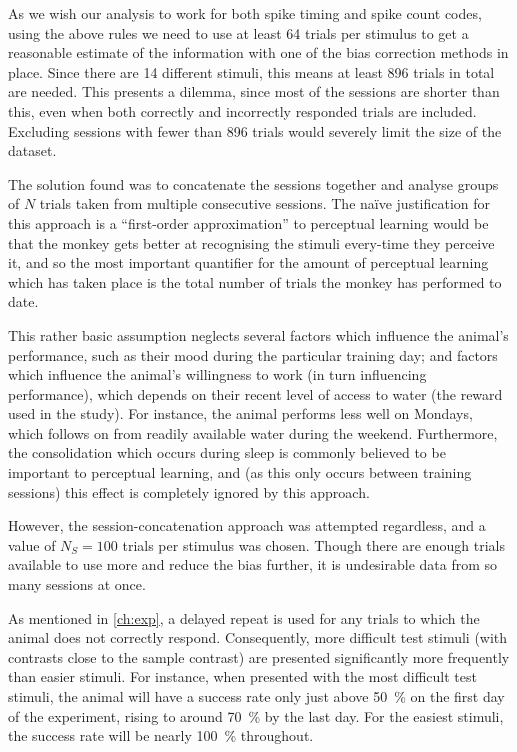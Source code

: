 As we wish our analysis to work for both spike timing and spike count codes, using the above rules we need to use at least 64 trials per stimulus to get a reasonable estimate of the information with one of the bias correction methods in place.
Since there are 14 different stimuli, this means at least 896 trials in total are needed.
This presents a dilemma, since most of the sessions are shorter than this, even when both correctly and incorrectly responded trials are included.
Excluding sessions with fewer than 896 trials would severely limit the size of the dataset.

The solution found was to concatenate the sessions together and analyse groups of $N$ trials taken from multiple consecutive sessions.
The na\"{i}ve justification for this approach is a ``first-order approximation'' to perceptual learning would be that the monkey gets better at recognising the stimuli every-time they perceive it, and so the most important quantifier for the amount of perceptual learning which has taken place is the total number of trials the monkey has performed to date.

This rather basic assumption neglects several factors which influence the animal's performance, such as their mood during the particular training day; and factors which influence the animal's willingness to work (in turn influencing performance), which depends on their recent level of access to water (the reward used in the study).
For instance, the animal performs less well on Mondays, which follows on from readily available water during the weekend.
Furthermore, the consolidation which occurs during sleep is commonly believed to be important to perceptual learning, and (as this only occurs between training sessions) this effect is completely ignored by this approach.

However, the session-concatenation approach was attempted regardless, and a value of $N_S = 100$ trials per stimulus was chosen.
Though there are enough trials available to use more and reduce the bias further, it is undesirable data from so many sessions at once.

As mentioned in \autoref{ch:exp}, a delayed repeat is used for any trials to which the animal does not correctly respond.
Consequently, more difficult test stimuli (with contrasts close to the sample contrast) are presented significantly more frequently than easier stimuli.
For instance, when presented with the most difficult test stimuli, the animal will have a success rate only just above \SI{50}{\percent} on the first day of the experiment, rising to around \SI{70}{\percent} by the last day.
For the easiest stimuli, the success rate will be nearly \SI{100}{\percent} throughout.

